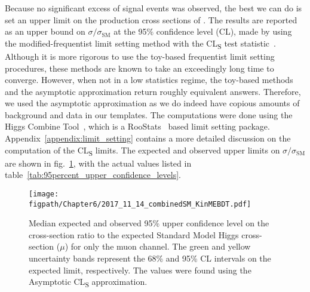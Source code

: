 Because no significant excess of signal events was observed, the best we can do is set an upper limit on the production cross sections of \HWWlvjj.
The results are reported as an upper bound on $\sigma/\sigma_{\text{SM}}$ at the 95\% confidence level (CL), made by using the modified-frequentist limit setting method with the CL\textsubscript{S} test statistic~\cite{Read:presentation,Junk,LHC-HCG}.
Although it is more rigorous to use the toy-based frequentist limit setting procedures, these methods are known to take an exceedingly long time to converge.
However, when not in a low statistics regime, the toy-based methods and the asymptotic approximation return roughly equivalent answers.
Therefore, we used the asymptotic approximation as we do indeed have copious amounts of background and data in our templates.
The computations were done using the Higgs Combine Tool~\cite{HiggsCombineTwiki}, which is a RooStats~\cite{Schott:2012zb} based limit setting package.
Appendix~\ref{appendix:limit_setting} contains a more detailed discussion on the computation of the CL\textsubscript{S} limits.
The expected and observed upper limits on $\sigma/\sigma_{\text{SM}}$ are shown in fig.~\ref{fig:limits_withSys_muon}, with the actual values listed in table~\ref{tab:95percent_upper_confidence_levels}.

\begin{comment}
Rishi:
The p-value of the excess at 125 GeV is 3.2σ.

To quantify, how probable the observed excess of events is above the background fluctuations the combined p-value is computed for the best-fit Higgs mass of 124.7GeV with a statistical significance of 5.65σ
\end{comment}

\begin{figure}[!hbt]
    \centering
    \texttt{[image: \\figpath/Chapter6/2017\_11\_14\_combinedSM\_KinMEBDT.pdf]}
    \caption{Median expected and observed 95\% upper confidence level on the cross-section ratio to the expected Standard Model Higgs cross-section ($\mu$) for only the muon channel. The green and yellow uncertainty bands represent the 68\% and 95\% CL intervals on the expected limit, respectively. The values were found using the Asymptotic CL\textsubscript{S} approximation.}
    \label{fig:limits_withSys_muon}
\end{figure}

